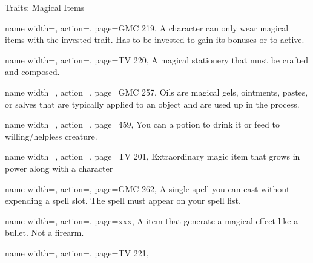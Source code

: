 \begin{PageBack}
\begin{Tables}{\backTableHeight}
\begin{Table}{Traits: Magical Items}
\begin{entry}{}{%
                name width=\conditionLength,%
                action=\Invested,
                page=GMC 219,
            }
                A character can only wear  magical items with the invested trait. Has to be invested to gain its bonuses or to active.
            \end{entry}
            \begin{entry}{}{%
                name width=\conditionLength,%
                action=\Missive,
                page=TV 220,
            }
                A magical stationery that must be crafted and composed.
            \end{entry}
            \begin{entry}{}{%
                name width=\conditionLength,%
                action=\Oil,
                page=GMC 257,
            }
                Oils are magical gels, ointments, pastes, or salves that are typically applied to an object and
                are used up in the process.
            \end{entry}
            \begin{entry}{}{%
                name width=\conditionLength,%
                action=\Potion,
                page=459,
            }
                You can  a potion to drink it or feed to willing/helpless creature.\hfill{}
            \end{entry}
            \begin{entry}{}{%
                name width=\conditionLength,%
                action=\Relic,
                page=TV 201,
            }
                Extraordinary magic item that grows in power along with a character
            \end{entry}
            \begin{entry}{}{%
                name width=\conditionLength,%
                action=\Scroll,
                page=GMC 262,
            }
                A single spell you can cast without expending a spell slot. The spell must appear on your spell
                list.\hfill {}
            \end{entry}
            \begin{entry}{}{%
                name width=\conditionLength,%
                action=\Spellgun,
                page=xxx,
            }
                A item that generate a magical effect like a bullet. Not a firearm.
            \end{entry}
            \begin{entry}{}{%
                name width=\conditionLength,%
                action=\Spellheart,
                page=TV 221,
            }

\end{entry}
\end{Table}
\end{Tables}
\end{PageBack}
